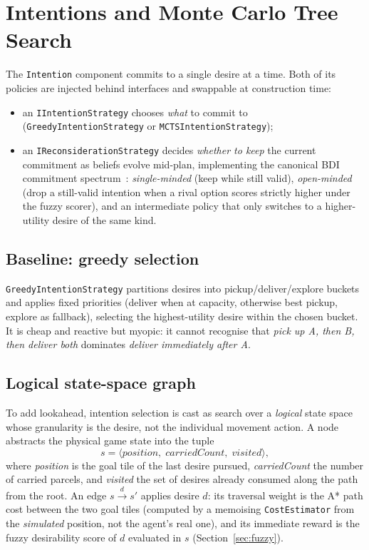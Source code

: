 \section{Intentions and Monte Carlo Tree Search}
\label{sec:intentions}

The \texttt{Intention} component commits to a single desire at a time. Both of its policies are
injected behind interfaces and swappable at construction time:

\begin{itemize}
    \item an \texttt{IIntentionStrategy} chooses \emph{what} to commit to
    (\texttt{GreedyIntentionStrategy} or \texttt{MCTSIntentionStrategy});
    \item an \texttt{IReconsiderationStrategy} decides \emph{whether to keep} the current
    commitment as beliefs evolve mid-plan, implementing the canonical BDI commitment
    spectrum~\cite{bratman1987}:
    \emph{single-minded} (keep while still valid), \emph{open-minded} (drop a still-valid
    intention when a rival option scores strictly higher under the fuzzy scorer), and an
    intermediate policy that only switches to a higher-utility desire of the same kind.
\end{itemize}

\subsection{Baseline: greedy selection}
\texttt{GreedyIntentionStrategy} partitions desires into pickup/deliver/explore buckets and
applies fixed priorities (deliver when at capacity, otherwise best pickup, explore as fallback),
selecting the highest-utility desire within the chosen bucket. It is cheap and reactive but
myopic: it cannot recognise that \emph{pick up A, then B, then deliver both} dominates
\emph{deliver immediately after A}.

\subsection{Logical state-space graph}
\label{sec:stategraph}
To add lookahead, intention selection is cast as search over a \emph{logical} state space whose
granularity is the desire, not the individual movement action. A node abstracts the physical
game state into the tuple
\[
s = \langle \mathit{position},\; \mathit{carriedCount},\; \mathit{visited} \rangle,
\]
where \textit{position} is the goal tile of the last desire pursued, \textit{carriedCount} the
number of carried parcels, and \textit{visited} the set of desires already consumed along the
path from the root. An edge $s \xrightarrow{d} s'$ applies desire $d$: its traversal weight is
the A* path cost between the two goal tiles (computed by a memoising \texttt{CostEstimator} from
the \emph{simulated} position, not the agent's real one), and its immediate reward is the fuzzy
desirability score of $d$ evaluated in $s$ (Section~\ref{sec:fuzzy}).

